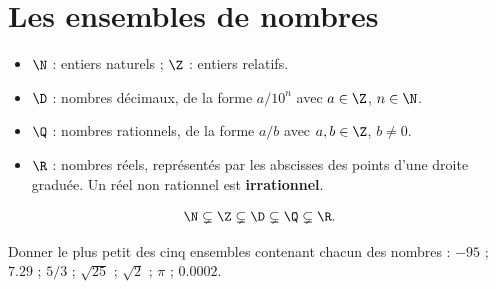 \section{Les ensembles de nombres}
\begin{keypoint}[Définitions]
\begin{itemize}
\item $\N$ : entiers naturels ; $\Z$ : entiers relatifs.
\item $\D$ : nombres décimaux, de la forme $a/10^n$ avec $a\in\Z$, $n\in\N$.
\item $\Q$ : nombres rationnels, de la forme $a/b$ avec $a,b\in\Z$, $b\ne0$.
\item $\R$ : nombres réels, représentés par les abscisses des points d'une droite graduée. Un réel non rationnel est \textbf{irrationnel}.
\end{itemize}
\[\N\subsetneq\Z\subsetneq\D\subsetneq\Q\subsetneq\R.\]
\end{keypoint}
\begin{center}\end{center}
\begin{example}Donner le plus petit des cinq ensembles contenant chacun des nombres : $-95$ ; $\num{7,29}$ ; $5/3$ ; $\sqrt{25}$ ; $\sqrt2$ ; $\pi$ ; $\num{0,0002}$.\end{example}

